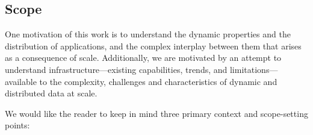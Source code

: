 

\subsection{Scope}




One motivation of this work is to understand the dynamic properties
and the distribution of applications, and the complex interplay
between them that arises as a consequence of scale.  Additionally, we
are motivated by an attempt to understand infrastructure---existing
capabilities, trends, and limitations---available to the complexity,
challenges and characteristics of dynamic and distributed data at
scale.

We would like the reader to keep in mind three primary context and
scope-setting points:


